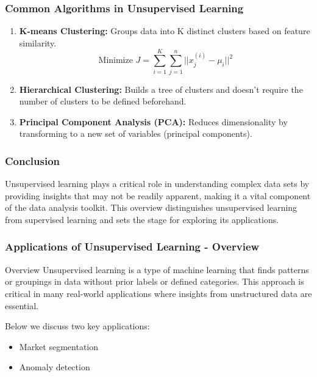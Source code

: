 \documentclass{beamer}
\begin{document}
\begin{frame}[fragile]
    \frametitle{Common Algorithms in Unsupervised Learning}
    \begin{enumerate}
        \item \textbf{K-means Clustering:} Groups data into K distinct clusters based on feature similarity.
            \begin{equation}
            \text{Minimize } J = \sum_{i=1}^{K} \sum_{j=1}^{n} || x_j^{(i)} - \mu_i ||^2 
            \end{equation}
        
        \item \textbf{Hierarchical Clustering:} Builds a tree of clusters and doesn’t require the number of clusters to be defined beforehand.
        
        \item \textbf{Principal Component Analysis (PCA):} Reduces dimensionality by transforming to a new set of variables (principal components).
    \end{enumerate}
\end{frame}

\begin{frame}[fragile]
    \frametitle{Conclusion}
    Unsupervised learning plays a critical role in understanding complex data sets by providing insights that may not be readily apparent, making it a vital component of the data analysis toolkit. This overview distinguishes unsupervised learning from supervised learning and sets the stage for exploring its applications.
\end{frame}

\begin{frame}[fragile]
    \frametitle{Applications of Unsupervised Learning - Overview}
    \begin{block}{Overview}
        Unsupervised learning is a type of machine learning that finds patterns or groupings in data without prior labels or defined categories. 
        This approach is critical in many real-world applications where insights from unstructured data are essential.
    \end{block}

    Below we discuss two key applications: 
    \begin{itemize}
        \item Market segmentation
        \item Anomaly detection
    \end{itemize}
\end{frame}
\end{document}
